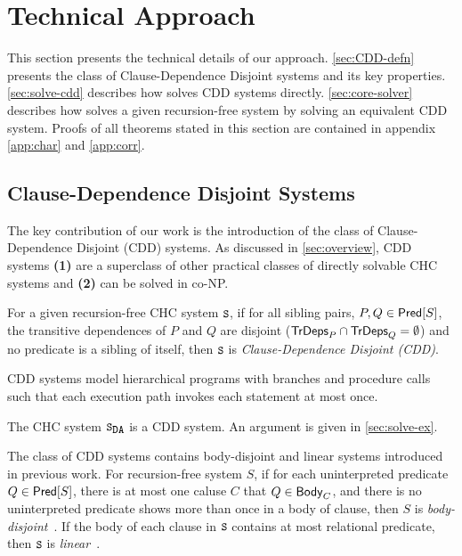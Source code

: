 \section{Technical Approach}
\label{sec:approach}
%
This section presents the technical details of our approach.
%
\autoref{sec:CDD-defn} presents the class of Clause-Dependence Disjoint
systems and its key properties.
%
\autoref{sec:solve-cdd} describes how \sys solves CDD systems
directly.
%
\autoref{sec:core-solver} describes how \sys solves a given
recursion-free system by solving an equivalent CDD system.
%
Proofs of all theorems stated in this section are contained in appendix
\autoref{app:char} and \autoref{app:corr}.

\subsection{Clause-Dependence Disjoint Systems}
\label{sec:CDD-defn}
%
The key contribution of our work is the introduction of the class of
Clause-Dependence Disjoint (CDD) systems. As discussed in
\autoref{sec:overview}, CDD systems \textbf{(1)} are a superclass of other
practical classes of directly solvable CHC systems and \textbf{(2)} can be
solved in co-NP.
%
\begin{defn}
  \label{defn:cdds}
  For a given recursion-free CHC system $\cc{S}$,
  if for all sibling pairs, $P, Q \in \mathsf{Pred}[ S ]$,
  the transitive dependences of $P$ and $Q$ are disjoint ($\mathsf{TrDeps}_{P} \cap
  \mathsf{TrDeps}_{Q} = \emptyset$)
  and no predicate is a sibling of itself,
  then $\cc{S}$ is \emph{Clause-Dependence Disjoint (CDD)}.
\end{defn}
%
CDD systems model hierarchical programs with branches and procedure calls such
that each execution path invokes each statement at most once.
%
\begin{ex}
  The CHC system $\mcchc$ is a CDD system. An argument is given in
  \autoref{sec:solve-ex}.
\end{ex}

The class of CDD systems contains body-disjoint and linear
systems introduced in previous work.
%
For recursion-free system $S$, if for each uninterpreted predicate
$Q \in \mathsf{Pred}[ S ]$, there is at most one caluse $C$ that $Q \in \mathsf{Body}_{C}$,
and there is no uninterpreted predicate shows more than once in a body of clause, then
$S$ is \emph{body-disjoint}~\cite{rummer13a,rummer13b}.
%
If the body of each clause in $\cc{S}$ contains at most
relational predicate, then $\cc{S}$ is
\emph{linear}~\cite{albarghouthi12a}.


